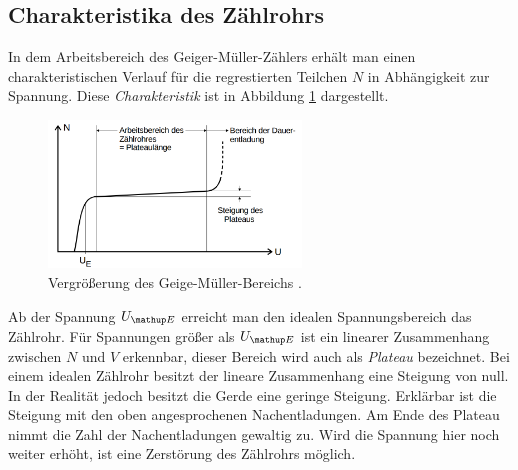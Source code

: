 \subsection{Charakteristika des Zählrohrs}
In dem Arbeitsbereich des Geiger-Müller-Zählers erhält man einen
charakteristischen Verlauf für die regrestierten Teilchen $N$ in Abhängigkeit zur Spannung. %
Diese \emph{Charakteristik} ist in Abbildung \ref{fig: plateau} dargestellt.
\begin{figure}
  \centering
  \includegraphics[width=0.6\textwidth]{bilder/pleateu.png}
  \caption{Vergrößerung des Geige-Müller-Bereichs \cite{anleitung703}.}
  \label{fig: plateau}
\end{figure}
Ab der Spannung $U\ua{E}$ erreicht man den idealen Spannungsbereich das Zählrohr. %
Für Spannungen größer als $U\ua{E}$ ist ein
linearer Zusammenhang zwischen $N$ und $V$ erkennbar, dieser Bereich wird auch als
\emph{Plateau} bezeichnet. Bei einem idealen Zählrohr besitzt der
lineare Zusammenhang eine Steigung von null. In der Realität jedoch besitzt
die Gerde eine geringe Steigung. Erklärbar ist die Steigung mit den oben angesprochenen Nachentladungen. %
Am Ende des Plateau nimmt die
Zahl der Nachentladungen gewaltig zu. Wird die Spannung hier noch weiter erhöht, %
ist eine Zerstörung des Zählrohrs möglich.

